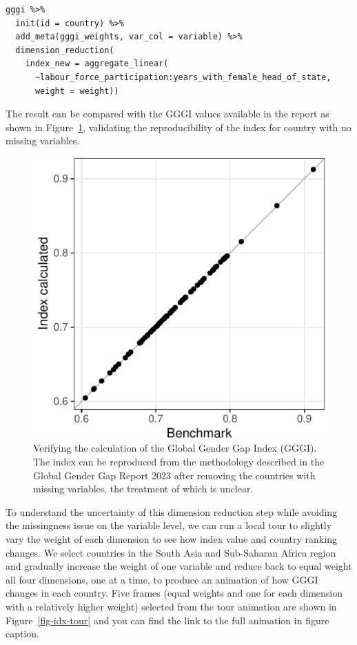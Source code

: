 \documentclass[
]{interact}
\begin{document}
\begin{verbatim}
gggi %>% 
  init(id = country) %>%
  add_meta(gggi_weights, var_col = variable) %>% 
  dimension_reduction(
    index_new = aggregate_linear(
      ~labour_force_participation:years_with_female_head_of_state,
      weight = weight)) 
\end{verbatim}

The result can be compared with the GGGI values available in the report
as shown in Figure~\ref{fig-compare-gggi}, validating the
reproducibility of the index for country with no missing variables.

\begin{figure}

{\centering \includegraphics{tidyindex_files/figure-pdf/fig-compare-gggi-1.pdf}

}

\caption{\label{fig-compare-gggi}Verifying the calculation of the Global
Gender Gap Index (GGGI). The index can be reproduced from the
methodology described in the Global Gender Gap Report 2023 after
removing the countries with missing variables, the treatment of which is
unclear.}

\end{figure}

To understand the uncertainty of this dimension reduction step while
avoiding the missingness issue on the variable level, we can run a local
tour to slightly vary the weight of each dimension to see how index
value and country ranking changes. We select countries in the South Asia
and Sub-Saharan Africa region and gradually increase the weight of one
variable and reduce back to equal weight all four dimensions, one at a
time, to produce an animation of how GGGI changes in each country. Five
frames (equal weights and one for each dimension with a relatively
higher weight) selected from the tour animation are shown in
Figure~\ref{fig-idx-tour} and you can find the link to the full
animation in figure caption.
\end{document}
